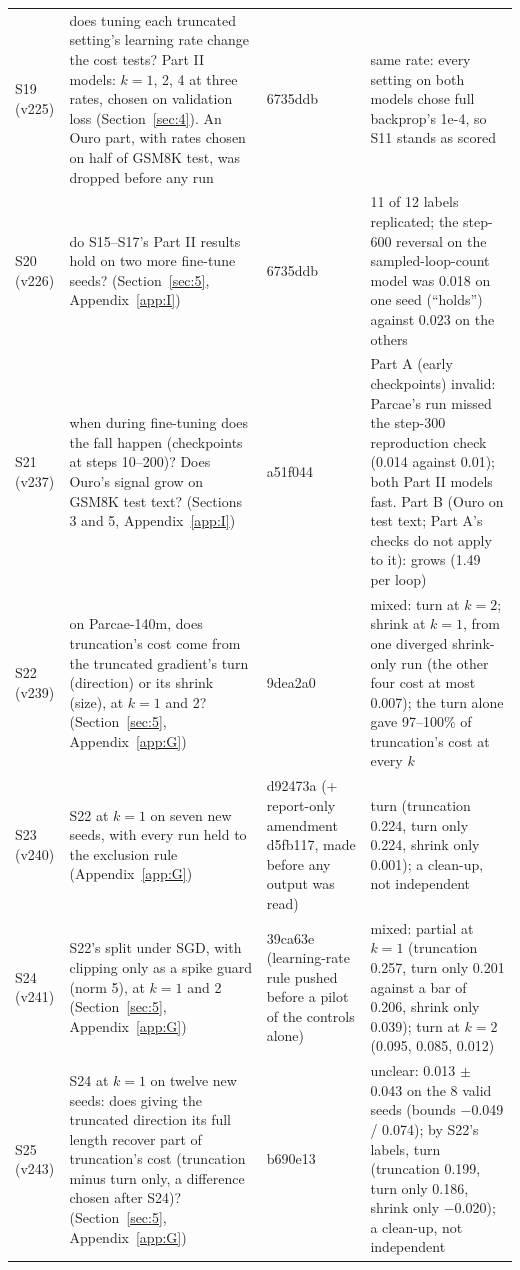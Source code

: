 \documentclass[10pt]{article}
\begin{document}
{\begin{xltabular}{\linewidth}{lXXX}
S19 (v225) & does tuning each truncated setting's learning rate change the cost tests? Part II models: $k = 1$, 2, 4 at three rates, chosen on validation loss (Section~\ref{sec:4}). An Ouro part, with rates chosen on half of GSM8K test, was dropped before any run & 6735ddb & same rate: every setting on both models chose full backprop's 1e-4, so S11 stands as scored \\
S20 (v226) & do S15--S17's Part II results hold on two more fine-tune seeds? (Section~\ref{sec:5}, Appendix~\ref{app:I}) & 6735ddb & 11 of 12 labels replicated; the step-600 reversal on the sampled-loop-count model was 0.018 on one seed (``holds'') against 0.023 on the others \\
S21 (v237) & when during fine-tuning does the fall happen (checkpoints at steps 10--200)? Does Ouro's signal grow on GSM8K test text? (Sections 3 and 5, Appendix~\ref{app:I}) & a51f044 & Part A (early checkpoints) invalid: Parcae's run missed the step-300 reproduction check (0.014 against 0.01); both Part II models fast. Part B (Ouro on test text; Part A's checks do not apply to it): grows (1.49 per loop) \\
S22 (v239) & on Parcae-140m, does truncation's cost come from the truncated gradient's turn (direction) or its shrink (size), at $k = 1$ and 2? (Section~\ref{sec:5}, Appendix~\ref{app:G}) & 9dea2a0 & mixed: turn at $k = 2$; shrink at $k = 1$, from one diverged shrink-only run (the other four cost at most 0.007); the turn alone gave 97--100\% of truncation's cost at every $k$ \\
S23 (v240) & S22 at $k = 1$ on seven new seeds, with every run held to the exclusion rule (Appendix~\ref{app:G}) & d92473a (+ report-only amendment d5fb117, made before any output was read) & turn (truncation 0.224, turn only 0.224, shrink only 0.001); a clean-up, not independent \\
S24 (v241) & S22's split under SGD, with clipping only as a spike guard (norm 5), at $k = 1$ and 2 (Section~\ref{sec:5}, Appendix~\ref{app:G}) & 39ca63e (learning-rate rule pushed before a pilot of the controls alone) & mixed: partial at $k = 1$ (truncation 0.257, turn only 0.201 against a bar of 0.206, shrink only 0.039); turn at $k = 2$ (0.095, 0.085, 0.012) \\
S25 (v243) & S24 at $k = 1$ on twelve new seeds: does giving the truncated direction its full length recover part of truncation's cost (truncation minus turn only, a difference chosen after S24)? (Section~\ref{sec:5}, Appendix~\ref{app:G}) & b690e13 & unclear: 0.013 $\pm$ 0.043 on the 8 valid seeds (bounds $-$0.049 / 0.074); by S22's labels, turn (truncation 0.199, turn only 0.186, shrink only $-$0.020); a clean-up, not independent \\
\end{xltabular}}
\end{document}
